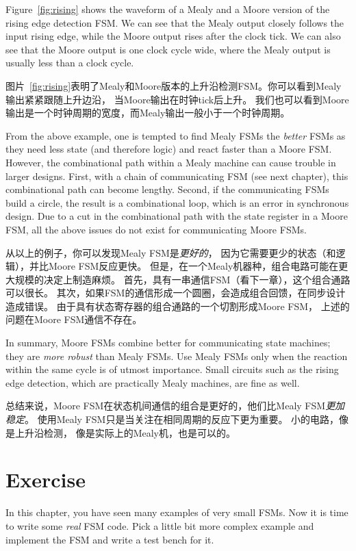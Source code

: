 \documentclass[%
    10pt,
    headinclude, footexclude,
    openright, %
    notitlepage,
    cleardoubleempty,
    headsepline,
    pointlessnumbers,
    bibtotoc, idxtotoc,
    ]{scrbook}
\begin{document}
Figure~\ref{fig:rising} shows the waveform of a Mealy and a  Moore version
of the rising edge detection FSM. We can see that the Mealy output closely
follows the input rising edge, while the Moore output rises after the clock tick.
We can also see that the Moore output is one clock cycle wide, where the Mealy
output is usually less than a clock cycle.

图片~\ref{fig:rising}表明了Mealy和Moore版本的上升沿检测FSM。你可以看到Mealy输出紧紧跟随上升边沿，
当Moore输出在时钟tick后上升。
我们也可以看到Moore输出是一个时钟周期的宽度，而Mealy输出一般小于一个时钟周期。

From the above example, one is tempted to find Mealy FSMs the \emph{better}
FSMs as they need less state (and therefore logic) and react faster than a Moore FSM.
However, the combinational path within a Mealy machine can cause trouble in
larger designs. First, with a chain of communicating FSM (see next chapter), this
combinational path can become lengthy. Second, if the communicating FSMs build
a circle, the result is a combinational loop, which is an error in synchronous design.
Due to a cut in the combinational path with the state register in a Moore FSM,
all the above issues do not exist for communicating Moore FSMs.

从以上的例子，你可以发现Mealy FSM是\emph{更好的}，
因为它需要更少的状态（和逻辑），并比Moore FSM反应更快。
但是，在一个Mealy机器种，组合电路可能在更大规模的决定上制造麻烦。
首先，具有一串通信FSM（看下一章），这个组合通路可以很长。
其次，如果FSM的通信形成一个圆圈，会造成组合回馈，在同步设计造成错误。
由于具有状态寄存器的组合通路的一个切割形成Moore FSM，
上述的问题在Moore FSM通信不存在。

In summary, Moore FSMs combine better for communicating state machines; they
are \emph{more robust} than Mealy FSMs. Use Mealy FSMs only when the reaction within the same
cycle is of utmost importance. Small circuits such as the rising edge detection,
which are practically Mealy machines, are fine as well.

总结来说，Moore FSM在状态机间通信的组合是更好的，他们比Mealy FSM\emph{更加稳定}。
使用Mealy FSM只是当关注在相同周期的反应下更为重要。
小的电路，像是上升沿检测，
像是实际上的Mealy机，也是可以的。

\section{Exercise}

In this chapter, you have seen many examples of very small FSMs.
Now it is time to write some \emph{real} FSM code.
Pick a little bit more complex example and implement the FSM and
write a test bench for it.
\end{document}
